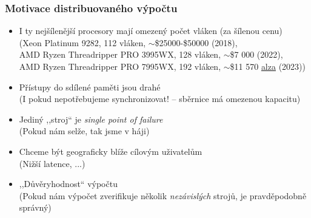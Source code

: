 \documentclass[usenames,dvipsnames,9pt]{beamer}
\begin{document}
\begin{frame}
  \frametitle{Motivace distribuovaného výpočtu}

  \begin{itemize}
    \pause\item I ty nejšílenější procesory mají omezený počet vláken (za šílenou cenu) \\
                {\small (Xeon Platinum 9282, 112 vláken, $\sim$\$25000-\$50000 (2018),}\\
                {\small AMD Ryzen Threadripper PRO 3995WX, 128 vláken, $\sim$\$7 000 (2022),}\\
                {\small AMD Ryzen Threadripper PRO 7995WX, 192 vláken, $\sim$\$11 570 \href{https://www.alza.cz/amd-ryzen-threadripper/18869777.htm}{alza} (2023))}

    \pause\item Přístupy do sdílené paměti jsou drahé \\
                {\small (I pokud nepotřebujeme synchronizovat! -- sběrnice má omezenou kapacitu)} \\[1.25em]

    \pause\item Jediný ,,stroj`` je \emph{single point of failure} \\
                {\small (Pokud nám selže, tak jsme v háji)}

    \pause\item Chceme být geograficky blíže cílovým uživatelům \\
                {\small (Nižší latence, ...)}
    \pause\item ,,Důvěryhodnost`` výpočtu \\
                {\small (Pokud nám výpočet zverifikuje několik \emph{nezávislých} strojů, je pravděpodobně správný)}
  \end{itemize}
\end{frame}


\end{document}
